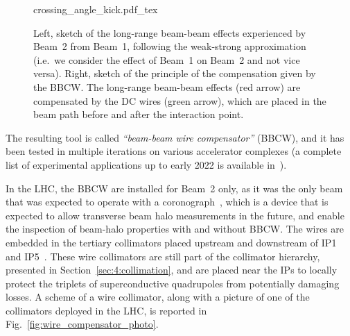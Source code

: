 \begin{figure}[hpt]
    \centering
    \def\svgwidth{1.0\textwidth}
    {crossing_angle_kick.pdf_tex}
    \caption{Left, sketch of the long-range beam-beam effects experienced by Beam~2 from Beam~1, following the weak-strong approximation (i.e.\ we consider the effect of Beam~1 on Beam~2 and not vice versa). Right, sketch of the principle of the compensation given by the BBCW. The long-range beam-beam effects (red arrow) are compensated by the DC wires (green arrow), which are placed in the beam path before and after the interaction point.}
    \label{fig:wire-baseline}
\end{figure}

The resulting tool is called \textit{``beam-beam wire compensator''} (BBCW), and it has been tested in multiple iterations on various accelerator complexes (a complete list of experimental applications up to early 2022 is available in~\cite{axel.wires}).

In the LHC, the BBCW are installed for Beam~2 only, as it was the only beam that was expected to operate with a coronograph~\cite{Goldblatt:2313940}, which is a device that is expected to allow transverse beam halo measurements in the future, and enable the inspection of beam-halo properties with and without BBCW. The wires are embedded in the tertiary collimators placed upstream and downstream of IP1 and IP5~\cite{Rossi:2696270}. These wire collimators are still part of the collimator hierarchy, presented in Section~\ref{sec:4:collimation}, and are placed near the IPs to locally protect the triplets of superconductive quadrupoles from potentially damaging losses. A scheme of a wire collimator, along with a picture of one of the collimators deployed in the LHC, is reported in Fig.~\ref{fig:wire_compensator_photo}.

